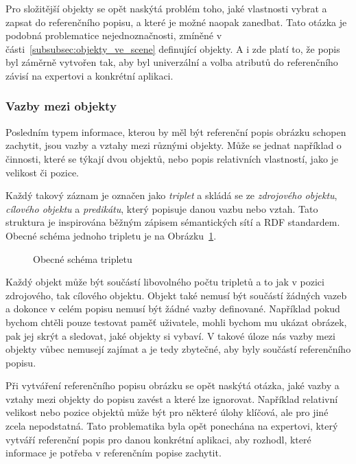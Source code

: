 Pro složitější objekty se opět naskýtá problém toho, jaké vlastnosti vybrat a zapsat do referenčního popisu, a které je možné naopak zanedbat.
Tato otázka je podobná problematice nejednoznačnosti, zmíněné v části~\ref{subsubsec:objekty_ve_scene} definující objekty.
A i zde platí to, že popis byl záměrně vytvořen tak, aby byl univerzální a volba atributů do referenčního závisí na expertovi a konkrétní aplikaci.


\subsubsection{Vazby mezi objekty}
Posledním typem informace, kterou by měl být referenční popis obrázku schopen zachytit, jsou vazby a vztahy mezi různými objekty.
Může se jednat například o činnosti, které se týkají dvou objektů, nebo popis relativních vlastností, jako je velikost či pozice.

Každý takový záznam je označen jako \emph{triplet} a skládá se ze \emph{zdrojového objektu},
\emph{cílového objektu} a \emph{predikátu}, který popisuje danou vazbu nebo vztah.
Tato struktura je inspirována běžným zápisem sémantických sítí a RDF standardem.
Obecné schéma jednoho tripletu je na Obrázku~\ref{fig:schema_tripletu}.

\begin{figure}[H]
	\centering
	\caption{Obecné schéma tripletu}\label{fig:schema_tripletu}
\end{figure}

Každý objekt může být součástí libovolného počtu tripletů a to jak v pozici zdrojového, tak cílového objektu.
Objekt také nemusí být součástí žádných vazeb a dokonce v celém popisu nemusí být žádné vazby definované.
Například pokud bychom chtěli pouze testovat paměť uživatele, mohli bychom mu ukázat obrázek, pak jej skrýt a sledovat, jaké objekty si vybaví.
V takové úloze nás vazby mezi objekty vůbec nemusejí zajímat a je tedy zbytečné, aby byly součástí referenčního popisu.

Při vytváření referenčního popisu obrázku se opět naskýtá otázka, jaké vazby a vztahy mezi objekty do popisu zavést a které lze ignorovat.
Například relativní velikost nebo pozice objektů může být pro některé úlohy klíčová, ale pro jiné zcela nepodstatná.
Tato problematika byla opět ponechána na expertovi, který vytváří referenční popis pro danou konkrétní aplikaci,
aby rozhodl, které informace je potřeba v referenčním popise zachytit.

